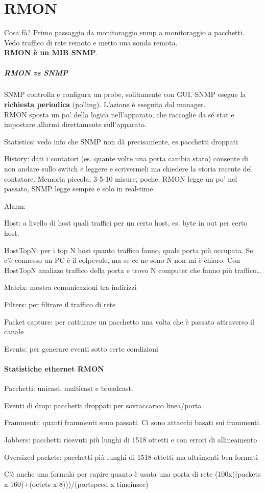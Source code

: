 \documentclass[10pt]{book}
\begin{document}
\section{RMON} Cosa fà? Primo passaggio da monitoraggio snmp a monitoraggio a pacchetti.\\
Vedo traffico di rete remoto e metto una sonda remota.\\
\textbf{RMON è un MIB SNMP}.
\subparagraph{RMON vs SNMP} SNMP controlla e configura un probe, solitamente con GUI. SNMP esegue la \textbf{richiesta periodica} (polling). L'azione è eseguita dal manager.\\
RMON sposta un po' della logica nell'apparato, che raccoglie da sé stat e impostare allarmi direttamente sull'apparato.
\begin{list}{}{\textbf{Gruppi RMON}}
	\item Statistics: vedo info che SNMP non dà precisamente, es pacchetti droppati
	\item History: dati i contatori (es. quante volte una porta cambia stato) consente di non andare sullo switch e leggere e scrivermeli ma chiedere la storia recente del contatore. Memoria piccola, 3-5-10 misure, poche. RMON legge un po' nel passato, SNMP legge sempre e solo in real-time
	\item Alarm: 
	\item Host: a livello di host quali traffici per un certo host, es. byte in out per certo host.
	\item HostTopN: per i top N host quanto traffico fanno, quale porta più occupata. Se c'è connesso un PC è il colpevole, ma se ce ne sono N non mi è chiaro. Con HostTopN analizzo traffico della porta e trovo N computer che fanno più traffico\ldots
	\item Matrix: mostra comunicazioni tra indirizzi
	\item Filters: per filtrare il traffico di rete
	\item Packet capture: per catturare un pacchetto una volta che è passato attraverso il canale
	\item Events: per generare eventi sotto certe condizioni
\end{list}
\paragraph{Statistiche ethernet RMON}
\begin{list}{}{Informazioni di basso livello}
	\item Pacchetti: unicast, multicast e broadcast.
	\item Eventi di drop: pacchetti droppati per sovraccarico linea/porta
	\item Frammenti: quanti frammenti sono passati. Ci sono attacchi basati sui frammenti.
	\item Jabbers: pacchetti ricevuti più lunghi di 1518 ottetti e con errori di allineamento
	\item Oversized packets: pacchetti più lunghi di 1518 ottetti ma altrimenti ben formati
\end{list}
C'è anche una formula per capire quanto è usata una porta di rete (100x((packets x 160)+(octets x 8)))/(portspeed x timeinsec)
\end{document}
